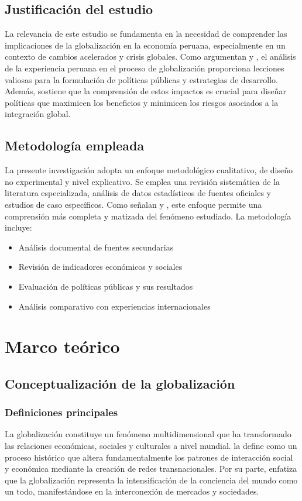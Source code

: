\documentclass[12pt, a4paper]{article}
\begin{document}
\subsection{Justificación del estudio}
La relevancia de este estudio se fundamenta en la necesidad de comprender las implicaciones de la globalización en la economía peruana, especialmente en un contexto de cambios acelerados y crisis globales. Como argumentan \textcite{mendoza2020} y \textcite{castillo2018}, el análisis de la experiencia peruana en el proceso de globalización proporciona lecciones valiosas para la formulación de políticas públicas y estrategias de desarrollo. Además, \textcite{seminario2019} sostiene que la comprensión de estos impactos es crucial para diseñar políticas que maximicen los beneficios y minimicen los riesgos asociados a la integración global.

\subsection{Metodología empleada}
La presente investigación adopta un enfoque metodológico cualitativo, de diseño no experimental y nivel explicativo. Se emplea una revisión sistemática de la literatura especializada, análisis de datos estadísticos de fuentes oficiales y estudios de caso específicos. Como señalan \textcite{barrantes2021} y \textcite{lopez2020}, este enfoque permite una comprensión más completa y matizada del fenómeno estudiado. La metodología incluye:

\begin{itemize}
    \item Análisis documental de fuentes secundarias
    \item Revisión de indicadores económicos y sociales
    \item Evaluación de políticas públicas y sus resultados
    \item Análisis comparativo con experiencias internacionales
\end{itemize}

\section{Marco teórico}

\subsection{Conceptualización de la globalización}

\subsubsection{Definiciones principales}
La globalización constituye un fenómeno multidimensional que ha transformado las relaciones económicas, sociales y culturales a nivel mundial. \textcite{held2000} la define como un proceso histórico que altera fundamentalmente los patrones de interacción social y económica mediante la creación de redes transnacionales. Por su parte, \textcite{robertson2003} enfatiza que la globalización representa la intensificación de la conciencia del mundo como un todo, manifestándose en la interconexión de mercados y sociedades.
\end{document}
